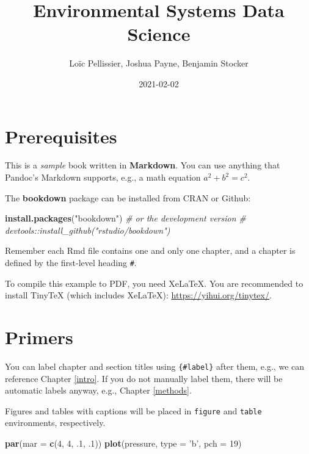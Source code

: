 \documentclass[
]{book}
\title{Environmental Systems Data Science}
\author{Loïc Pellissier, Joshua Payne, Benjamin Stocker}
\date{2021-02-02}
\newenvironment{Shaded}{\begin{snugshade}}{\end{snugshade}}
\newcommand{\CommentTok}[1]{\textcolor[rgb]{0.56,0.35,0.01}{\textit{#1}}}
\newcommand{\DataTypeTok}[1]{\textcolor[rgb]{0.13,0.29,0.53}{#1}}
\newcommand{\DecValTok}[1]{\textcolor[rgb]{0.00,0.00,0.81}{#1}}
\newcommand{\FloatTok}[1]{\textcolor[rgb]{0.00,0.00,0.81}{#1}}
\newcommand{\KeywordTok}[1]{\textcolor[rgb]{0.13,0.29,0.53}{\textbf{#1}}}
\newcommand{\NormalTok}[1]{#1}
\newcommand{\StringTok}[1]{\textcolor[rgb]{0.31,0.60,0.02}{#1}}
\begin{document}
\maketitle

{
\setcounter{tocdepth}{1}
\tableofcontents
}
\hypertarget{prerequisites}{%
\chapter{Prerequisites}\label{prerequisites}}

This is a \emph{sample} book written in \textbf{Markdown}. You can use anything that Pandoc's Markdown supports, e.g., a math equation \(a^2 + b^2 = c^2\).

The \textbf{bookdown} package can be installed from CRAN or Github:

\begin{Shaded}
\begin{Highlighting}[]
\KeywordTok{install.packages}\NormalTok{(}\StringTok{"bookdown"}\NormalTok{)}
\CommentTok{# or the development version}
\CommentTok{# devtools::install_github("rstudio/bookdown")}
\end{Highlighting}
\end{Shaded}

Remember each Rmd file contains one and only one chapter, and a chapter is defined by the first-level heading \texttt{\#}.

To compile this example to PDF, you need XeLaTeX. You are recommended to install TinyTeX (which includes XeLaTeX): \url{https://yihui.org/tinytex/}.

\hypertarget{primers}{%
\chapter{Primers}\label{primers}}

You can label chapter and section titles using \texttt{\{\#label\}} after them, e.g., we can reference Chapter \ref{intro}. If you do not manually label them, there will be automatic labels anyway, e.g., Chapter \ref{methods}.

Figures and tables with captions will be placed in \texttt{figure} and \texttt{table} environments, respectively.

\begin{Shaded}
\begin{Highlighting}[]
\KeywordTok{par}\NormalTok{(}\DataTypeTok{mar =} \KeywordTok{c}\NormalTok{(}\DecValTok{4}\NormalTok{, }\DecValTok{4}\NormalTok{, }\FloatTok{.1}\NormalTok{, }\FloatTok{.1}\NormalTok{))}
\KeywordTok{plot}\NormalTok{(pressure, }\DataTypeTok{type =} \StringTok{'b'}\NormalTok{, }\DataTypeTok{pch =} \DecValTok{19}\NormalTok{)}
\end{Highlighting}
\end{Shaded}
\end{document}
